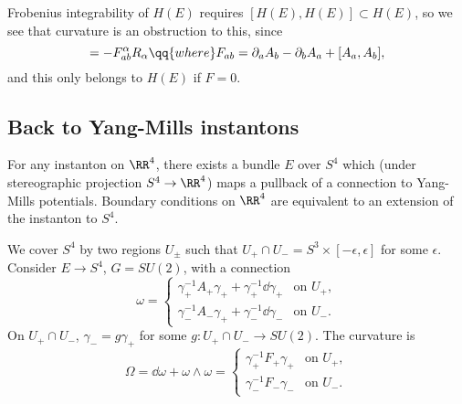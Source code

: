 \documentclass{jknotes}
\begin{document}
Frobenius integrability of \(H(E)\) requires \([H(E),H(E)]\subset H(E)\), so we see that curvature is an obstruction to this, since
\begin{equation}
    [D_a,D_b] = -F_{ab}^\alpha R_\alpha \qq{where} F_{ab}=\partial_a A_b - \partial_b A_a + [A_a,A_b],
\end{equation}
and this only belongs to \(H(E)\) if \(F=0\).

\subsection{Back to Yang-Mills instantons}
For any instanton on \(\RR^4\), there exists a bundle \(E\) over \(S^4\) which (under stereographic projection \(S^4\to\RR^4\)) maps a pullback of a connection to Yang-Mills potentials. Boundary conditions on \(\RR^4\) are equivalent to an extension of the instanton to \(S^4\).

We cover \(S^4\) by two regions \(U_\pm\) such that \(U_+\cap U_-=S^3\times[-\epsilon,\epsilon]\) for some \(\epsilon\). Consider \(E\to S^4\), \(G=SU(2)\), with a connection
\begin{equation}
    \omega = 
    \begin{cases}
        \gamma_+^{-1}A_+\gamma_+ + \gamma_+^{-1}\dd{\gamma_+} & \text{on \(U_+\)}, \\
        \gamma_-^{-1}A_-\gamma_+ + \gamma_-^{-1}\dd{\gamma_-} & \text{on \(U_-\)}. 
    \end{cases}
\end{equation}
On \(U_+\cap U_-\), \(\gamma_- = g\gamma_+\) for some \(g:U_+\cap U_- \to SU(2)\). The curvature is
\begin{equation}
    \Omega = \dd{\omega} + \omega \wedge\omega = 
    \begin{cases}
        \gamma_+^{-1}F_+\gamma_+ & \text{on \(U_+\)}, \\
        \gamma_-^{-1}F_-\gamma_- & \text{on \(U_-\)}.
    \end{cases}
\end{equation}
\end{document}
